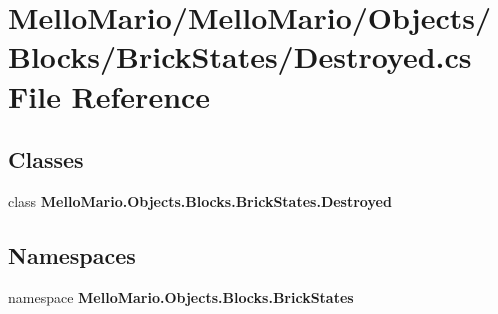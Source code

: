 \section{Mello\+Mario/\+Mello\+Mario/\+Objects/\+Blocks/\+Brick\+States/\+Destroyed.cs File Reference}
\label{Destroyed_8cs}
\subsection*{Classes}
\begin{DoxyCompactItemize}
\item 
class \textbf{ Mello\+Mario.\+Objects.\+Blocks.\+Brick\+States.\+Destroyed}
\end{DoxyCompactItemize}
\subsection*{Namespaces}
\begin{DoxyCompactItemize}
\item 
namespace \textbf{ Mello\+Mario.\+Objects.\+Blocks.\+Brick\+States}
\end{DoxyCompactItemize}
